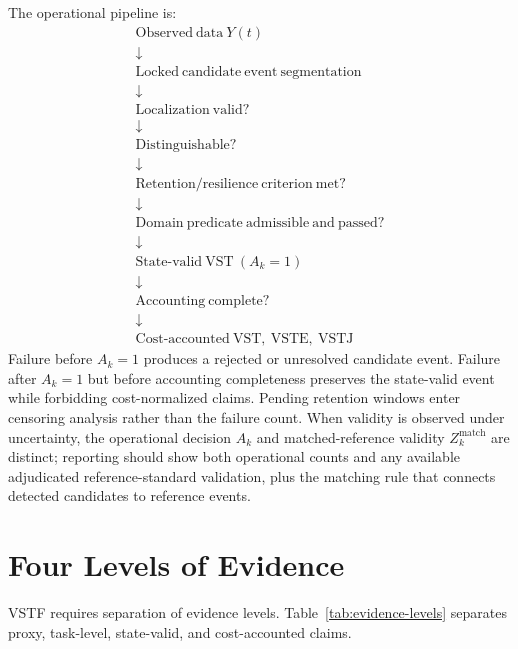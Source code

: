 \documentclass[11pt,a4paper]{article}
\newcommand{\VSTE}{\ensuremath{\mathrm{VSTE}}}
\newcommand{\VSTJ}{\ensuremath{\mathrm{VSTJ}}}
\newcommand{\1}{\mathbf{1}}
\begin{document}
The operational pipeline is:
\[
\begin{array}{c}
\mathrm{Observed\ data}\ Y(t)\\
\downarrow\\
\mathrm{Locked\ candidate\ event\ segmentation}\\
\downarrow\\
\mathrm{Localization\ valid?}\\
\downarrow\\
\mathrm{Distinguishable?}\\
\downarrow\\
\mathrm{Retention/resilience\ criterion\ met?}\\
\downarrow\\
\mathrm{Domain\ predicate\ admissible\ and\ passed?}\\
\downarrow\\
\mathrm{State\mbox{-}valid\ VST}\ (A_k=1)\\
\downarrow\\
\mathrm{Accounting\ complete?}\\
\downarrow\\
\mathrm{Cost\mbox{-}accounted\ VST,\ \VSTE{},\ \VSTJ{}}
\end{array}
\]
Failure before $A_k=1$ produces a rejected or unresolved candidate event. Failure after $A_k=1$ but before accounting completeness preserves the state-valid event while forbidding cost-normalized claims. Pending retention windows enter censoring analysis rather than the failure count.
When validity is observed under uncertainty, the operational decision $A_k$ and matched-reference validity $Z^{\mathrm{match}}_k$ are distinct; reporting should show both operational counts and any available adjudicated reference-standard validation, plus the matching rule that connects detected candidates to reference events.

\section{Four Levels of Evidence}

VSTF requires separation of evidence levels. Table~\ref{tab:evidence-levels} separates proxy, task-level, state-valid, and cost-accounted claims.
\end{document}
